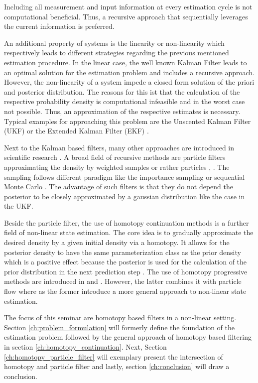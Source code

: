 \documentclass[a4paper]{IEEEtran}
\begin{document}
Including all measurement and input information at every estimation cycle is not computational beneficial. Thus, a recursive approach that sequentially leverages the current information is preferred.

An additional property of systems is the linearity or non-linearity which respectively leads to different strategies regarding the previous mentioned estimation procedure.
In the linear case, the well known Kalman Filter \cite{Kalman1960} leads to an optimal solution for the estimation problem and includes a recursive approach. However, the non-linearity of a system
impede a closed form solution of the priori and posterior distribution. The reasons for this ist that the calculation of the respective probability density is computational infeasible and in the worst case not
possible. Thus, an approximation of the respective estimates is necessary. Typical examples for approaching this problem are the Unscented Kalman Filter (UKF) \cite{julier2004} or the Extended Kalman Filter (EKF) \cite{jazwinski2007}.

Next to the Kalman based filters, many other approaches are introduced in scientific research \cite{daum2005}. A broad field of recursive methods are particle filters approximating the density by weighted samples or rather particles \cite{arulampalam2002}, \cite{crisan2002}. 
The sampling follows different paradigm like the importance sampling or sequential Monte Carlo \cite{cappe2007b}. The advantage of such filters is that they do not depend the posterior to be closely approximated by a gaussian distribution \cite{cappe2007b} like the 
case in the UKF.

Beside the particle filter, the use of homotopy continuation methods is a further field of non-linear state estimation. The core idea is to gradually approximate the desired density by a given initial density via a homotopy. 
It allows for the posterior density to have the same parameterization class as the prior density which is a positive effect because the posterior is used for the calculation of the prior distribution in the next prediction step \cite{hagmar2011}. 
The use of homotopy progressive methods are introduced in \cite{hanebeck2003} and \cite{daum2005}. However, the latter combines it with particle flow where as the former introduce a more general approach to non-linear state estimation.

The focus of this seminar are homotopy based filters in a non-linear setting. Section \ref{ch:problem_formulation} will formerly define the foundation of the estimation problem followed by the general approach of
homotopy based filtering in section \ref{ch:homotopy_continuation}. Next, Section \ref{ch:homotopy_particle_filter} will exemplary present the intersection of homotopy and particle filter and lastly, section \ref{ch:conclusion} will draw a conclusion.
\end{document}
